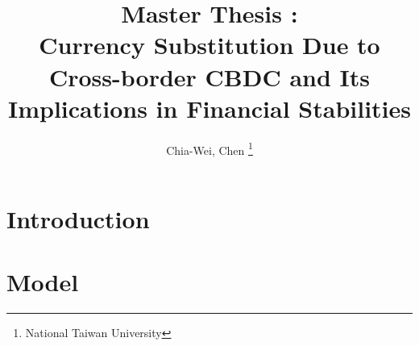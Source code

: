 \documentclass{article}
\title{Master Thesis : \\ 
Currency Substitution Due to Cross-border CBDC and Its Implications in Financial Stabilities}
\author{Chia-Wei, Chen \thanks{National Taiwan University}}
\theoremstyle{definition}
\begin{document}
    \maketitle
    \begin{abstract}
        
    \end{abstract}


    \section{Introduction}
    
    \section{Model}
     


    
    
\end{document}
